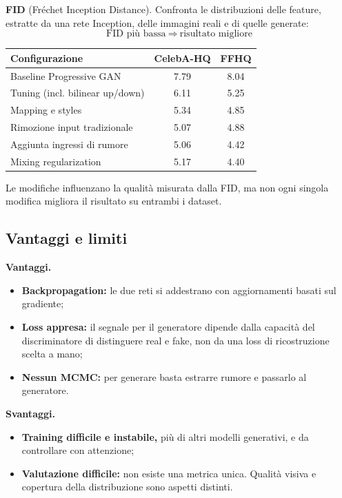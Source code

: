 \documentclass[11pt,a4paper]{article}
\begin{document}
\textbf{FID} (Fréchet Inception Distance). Confronta le distribuzioni delle
feature, estratte da una rete Inception, delle immagini reali e di quelle generate:
\[
\boxed{\text{FID più bassa}\ \Longrightarrow\ \text{risultato migliore}}
\]
\begin{center}
\renewcommand{\arraystretch}{1.25}
\begin{tabular}{|l|c|c|}
\hline
\textbf{Configurazione} & \textbf{CelebA-HQ} & \textbf{FFHQ} \\
\hline
Baseline Progressive GAN & 7.79 & 8.04 \\
\hline
Tuning (incl. bilinear up/down) & 6.11 & 5.25 \\
\hline
Mapping e styles & 5.34 & 4.85 \\
\hline
Rimozione input tradizionale & 5.07 & 4.88 \\
\hline
Aggiunta ingressi di rumore & 5.06 & 4.42 \\
\hline
Mixing regularization & 5.17 & 4.40 \\
\hline
\end{tabular}
\end{center}
Le modifiche influenzano la qualità misurata dalla FID, ma non ogni singola
modifica migliora il risultato su entrambi i dataset.

\subsection{Vantaggi e limiti}

\textbf{Vantaggi.}
\begin{itemize}
  \item \textbf{Backpropagation:} le due reti si addestrano con aggiornamenti
        basati sul gradiente;
  \item \textbf{Loss appresa:} il segnale per il generatore dipende dalla
        capacità del discriminatore di distinguere real e fake, non da una loss
        di ricostruzione scelta a mano;
  \item \textbf{Nessun MCMC:} per generare basta estrarre rumore e passarlo al
        generatore.
\end{itemize}

\textbf{Svantaggi.}
\begin{itemize}
  \item \textbf{Training difficile e instabile,} più di altri modelli
        generativi, e da controllare con attenzione;
  \item \textbf{Valutazione difficile:} non esiste una metrica unica. Qualità
        visiva e copertura della distribuzione sono aspetti distinti.
\end{itemize}
\end{document}
